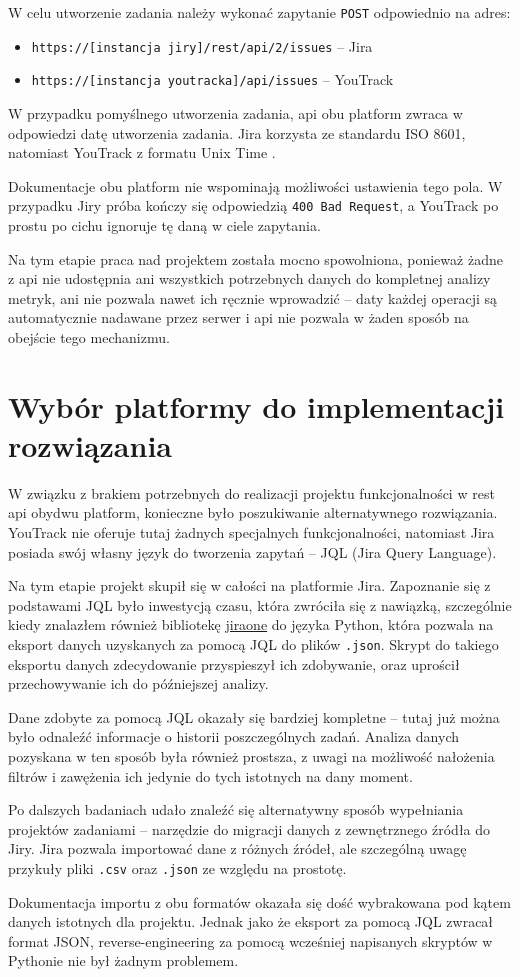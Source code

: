 W celu utworzenie zadania należy wykonać zapytanie \texttt{POST} odpowiednio na adres:
\begin{itemize}
    \item \texttt{https://[instancja jiry]/rest/api/2/issues} -- Jira
    \item \texttt{https://[instancja youtracka]/api/issues} -- YouTrack
\end{itemize}
W przypadku pomyślnego utworzenia zadania, api obu platform zwraca w odpowiedzi datę utworzenia zadania. Jira korzysta ze standardu ISO 8601, natomiast YouTrack z formatu Unix Time \cite{UnixProgrammersManual}.

Dokumentacje obu platform nie wspominają możliwości ustawienia tego pola. W przypadku Jiry próba kończy się odpowiedzią \texttt{400 Bad Request}, a YouTrack po prostu po cichu ignoruje tę daną
w ciele zapytania.

Na tym etapie praca nad projektem została mocno spowolniona, ponieważ żadne z api nie udostępnia ani wszystkich potrzebnych danych do kompletnej analizy metryk, ani nie pozwala nawet ich ręcznie wprowadzić -- daty każdej operacji
są automatycznie nadawane przez serwer i api nie pozwala w żaden sposób na obejście tego mechanizmu.

\section{Wybór platformy do implementacji rozwiązania}
W związku z brakiem potrzebnych do realizacji projektu funkcjonalności w rest api obydwu platform, konieczne było poszukiwanie alternatywnego rozwiązania.
YouTrack nie oferuje tutaj żadnych specjalnych funkcjonalności, natomiast Jira posiada swój własny język do tworzenia zapytań -- JQL (Jira Query Language). \cite{YouTrackSearch} \cite{JiraJQL}

Na tym etapie projekt skupił się w całości na platformie Jira. Zapoznanie się z podstawami JQL było inwestycją czasu, która zwróciła się z nawiązką, szczególnie kiedy znalazłem również bibliotekę \href{https://pypi.org/project/jiraone/}{jiraone} do języka Python,
która pozwala na eksport danych uzyskanych za pomocą JQL do plików \texttt{.json}. Skrypt do takiego eksportu danych zdecydowanie przyspieszył ich zdobywanie, oraz uprościł przechowywanie ich do późniejszej analizy.

Dane zdobyte za pomocą JQL okazały się bardziej kompletne -- tutaj już można było odnaleźć informacje o historii poszczególnych zadań. Analiza danych pozyskana w ten sposób była również prostsza, z uwagi na możliwość nałożenia filtrów i zawężenia ich
jedynie do tych istotnych na dany moment.

Po dalszych badaniach udało znaleźć się alternatywny sposób wypełniania projektów zadaniami -- narzędzie do migracji danych z zewnętrznego źródła do Jiry. \cite{JiraImportExport}
Jira pozwala importować dane z różnych źródeł, ale szczególną uwagę przykuły pliki \texttt{.csv} oraz \texttt{.json} ze względu na prostotę.

Dokumentacja importu z obu formatów okazała się dość wybrakowana pod kątem danych istotnych dla projektu. Jednak jako że eksport za pomocą JQL zwracał format JSON, reverse-engineering za pomocą wcześniej napisanych skryptów w Pythonie nie był
żadnym problemem.
